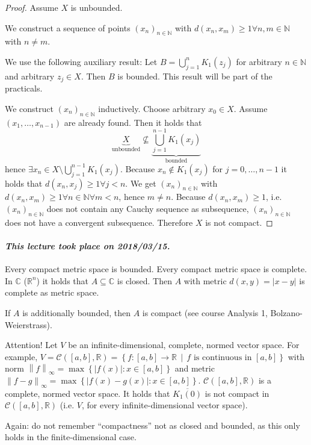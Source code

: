 \documentclass{article}
\newcommand{\set}[1]{\left\{#1\right\}}
\newcommand{\setdef}[2]{\left\{\left.#1\,\middle|\,#2\right.\right\}}
\newcommand{\norm}[1]{\left\|#1\right\|}
\newcommand{\card}[1]{\left|#1\right|}
\newcommand{\dateref}[1]{\paragraph{\textit{This lecture took place on #1.}}}
\begin{document}
\begin{proof}
  Assume $X$ is unbounded.

  We construct a sequence of points $(x_n)_{n \in \mathbb N}$ with $d(x_n, x_m) \geq 1 \forall n,m \in \mathbb N$ with $n \neq m$.

  We use the following auxiliary result: Let $B = \bigcup_{j=1}^n K_1(z_j)$ for arbitrary $n \in \mathbb N$ and arbitrary $z_j \in X$. Then $B$ is bounded. This result will be part of the practicals.

  We construct $(x_n)_{n\in\mathbb N}$ inductively. Choose arbitrary $x_0 \in X$. Assume $(x_1, \dots, x_{n-1})$ are already found. Then it holds that
  \[ \underbrace{X}_{\text{unbounded}} \not\subseteq \underbrace{\bigcup_{j=1}^{n-1} K_1(x_j)}_{\text{bounded}} \]
  hence $\exists x_n \in X \setminus \bigcup_{j=1}^{n-1} K_1(x_j)$.
  Because $x_n \not\in K_1(x_j)$ for $j = 0, \dots, n-1$ it holds that $d(x_n, x_j) \geq 1 \forall j < n$. We get $(x_n)_{n \in \mathbb N}$ with $d(x_n, x_m) \geq 1 \forall n \in \mathbb N \forall m < n$, hence $m \neq n$. Because $d(x_n, x_m) \geq 1$, i.e. $(x_n)_{n \in \mathbb N}$ does not contain any Cauchy sequence as subsequence, $(x_n)_{n \in \mathbb N}$ does not have a convergent subsequence. Therefore $X$ is not compact.
\end{proof}

\dateref{2018/03/15}

Every compact metric space is bounded. Every compact metric space is complete.
In $\mathbb C$ ($\mathbb R^n$) it holds that $A \subseteq \mathbb C$ is closed.
Then $A$ with metric $d(x,y) = \card{x - y}$ is complete as metric space.

If $A$ is additionally bounded, then $A$ is compact (see course Analysis 1, Bolzano-Weierstrass).

Attention! Let $V$ be an infinite-dimensional, complete, normed vector space.
For example, $V = \mathcal C([a,b], \mathbb R) = \setdef{f: [a,b] \to \mathbb R}{f \text{ is continuous in } [a,b]}$ with norm $\norm{f}_{\infty} = \max\set{\card{f(x)}: x \in [a,b]}$ and metric $\norm{f - g}_{\infty} = \max\set{\card{f(x) - g(x)}: x \in [a,b]}$. $\mathcal C([a,b], \mathbb R)$ is a complete, normed vector space.
It holds that $\overline{K_1(0)}$ is not compact in $\mathcal C([a,b], \mathbb R)$ (i.e. $V$, for every infinite-dimensional vector space).

Again: do not remember \enquote{compactness} not as closed and bounded, as this only holds in the finite-dimensional case.
\end{document}
